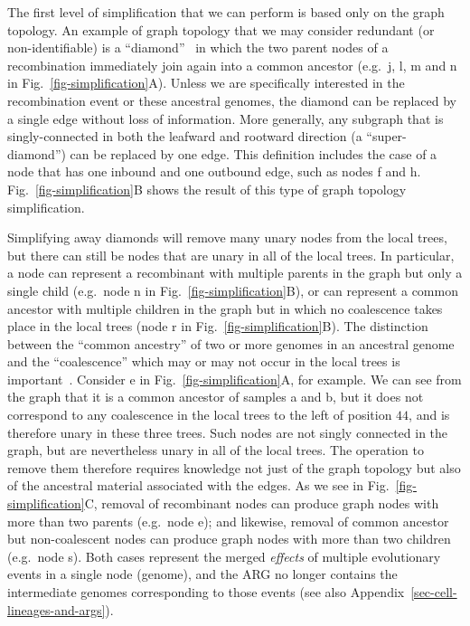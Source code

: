 \documentclass{article}
\newcommand{\noderef}[1]{\textsf{#1}}
\begin{document}
The first level of simplification that we can perform is based only
on the graph topology.
An example of graph topology that we may consider redundant
(or non-identifiable) is a
``diamond''~\citep{rasmussen2014genome}
in which the two parent nodes of a recombination immediately
join again into a common ancestor (e.g.~\noderef{j}, \noderef{l}, \noderef{m}
and \noderef{n} in Fig.~\ref{fig-simplification}A).
Unless we are specifically
interested in the recombination event or these ancestral genomes,
the diamond can be replaced by a single edge without loss of
information.
More generally, any subgraph that is singly-connected in both the leafward and
rootward direction (a ``super-diamond'') can be replaced by one edge.
This definition includes the case
of a node that has one inbound and one outbound edge, such as
nodes \noderef{f} and \noderef{h}.
Fig.~\ref{fig-simplification}B shows the result of this type of
graph topology simplification.

Simplifying away diamonds will remove many unary nodes from the
local trees, but there can still be nodes that are unary in all
of the local trees. In particular, a node can represent a recombinant
with multiple parents in the graph but only a single child (e.g.\ node \noderef{n}
in Fig.~\ref{fig-simplification}B), or can represent a common ancestor with
multiple children in the graph but in which no coalescence takes place
in the local trees
(node \noderef{r} in Fig.~\ref{fig-simplification}B).
The distinction between the ``common ancestry'' of two or more genomes
in an ancestral genome and the ``coalescence'' which may or may
not occur in the local trees is
important~\citep{hudson1983testing,kelleher2016efficient}.
Consider \noderef{e} in Fig.~\ref{fig-simplification}A,
for example. We can see from the graph that it is a common
ancestor of samples \noderef{a} and \noderef{b}, but
it does not correspond to any coalescence in the
local trees to the left of position $44$, and is therefore
unary in these three trees.
Such nodes are not singly connected in the graph, but are nevertheless unary in
all of the local trees.
The operation to remove them
therefore requires knowledge not just of the graph topology but also of the
ancestral material associated with the edges.
As we see in Fig.~\ref{fig-simplification}C,
removal of recombinant nodes can produce graph nodes with
more than two parents (e.g.~node \noderef{e}); and likewise, removal of
common ancestor but non-coalescent nodes can produce graph nodes with
more than two children (e.g.~node \noderef{s}). Both cases represent the
merged
\emph{effects} of multiple evolutionary events in a single node (genome), and the
ARG no longer contains the intermediate genomes corresponding to
those events (see also Appendix~\ref{sec-cell-lineages-and-args}).
\end{document}
